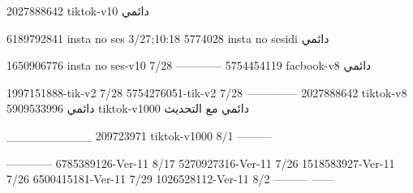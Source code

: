 2027888642 tiktok-v10
دائمي

6189792841 insta no ses
3/27;10:18
5774028 insta no sesidi
دائمي

1650906776 insta no ses-v10
7/28
------------
5754454119 facbook-v8
دائمي

1997151888-tik-v2
7/28
5754276051-tik-v2
7/28
--------------
2027888642 tiktok-v8
دائمي
5909533996 tiktok-v1000
دائمي مع التحديث

__________
209723971 tiktok-v1000
8/1
---------

------------
6785389126-Ver-11
8/17
5270927316-Ver-11
7/26
1518583927-Ver-11
7/26
6500415181-Ver-11
7/29
1026528112-Ver-11
8/2
---------
------
